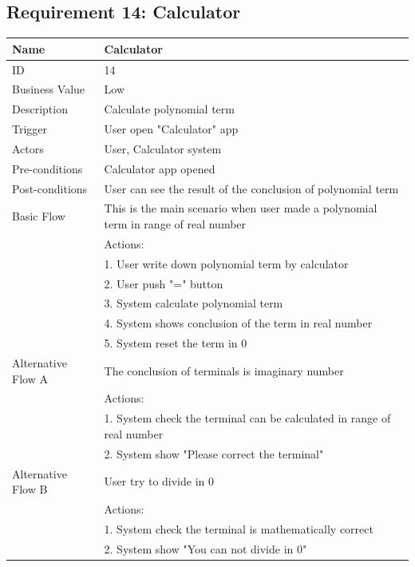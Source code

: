 \documentclass{article}
\begin{document}
		\subsection{Requirement 14: Calculator}
		\begin{table}[htbp]
			\centering
			\small
			\begin{tabularx}{\textwidth}{|>{\raggedright\arraybackslash}p{}|X|}
				\hline
				Name             & Calculator                                \\ \hline
				ID               & 14                                                                                       \\ \hline
				Business Value   & Low                                                                                    \\ \hline
				Description      & Calculate polynomial term \\ \hline
				Trigger          & User open "Calculator" app \\ \hline
				Actors           & User, Calculator system                                \\ \hline
				Pre-conditions   & Calculator app opened                                    \\ \hline
				Post-conditions  & User can see the result of the conclusion of polynomial term                                              \\ \hline
				Basic Flow       & This is the main scenario when user made a polynomial term in range of real number \\ \hline
								 & Actions: \\
								 & 1. User write down polynomial term by calculator \\
								 & 2. User push "=" button \\
								 & 3. System calculate polynomial term \\
								 & 4. System shows conclusion of the term in real number \\
								 & 5. System reset the term in 0 \\ \hline
				Alternative Flow A & The conclusion of terminals is imaginary number \\
								 & Actions: \\
								 & 1. System check the terminal can be calculated in range of real number \\
								 & 2. System show "Please correct the terminal" \\ \hline
				Alternative Flow B & User try to divide in 0 \\
								 & Actions: \\
								 & 1. System check the terminal is mathematically correct  \\
								 & 2. System show "You can not divide in 0" \\ \hline
			\end{tabularx}
		\end{table}
\end{document}
